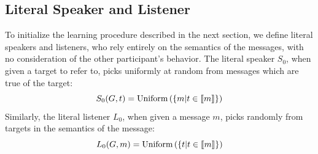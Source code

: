 \subsection{Literal Speaker and Listener}
To initialize the learning procedure described in the next section, we
define literal speakers and listeners, who rely entirely on the
semantics of the messages, with no consideration of the other
participant's behavior. The literal speaker $S_{0}$, when given a
target to refer to, picks uniformly at random from messages which are
true of the target:
%
\begin{equation}
S_{0}(G,t)  = \text{Uniform}\left(\{m \vert t \in \llbracket m\rrbracket\}\right)
\end{equation}
%
Similarly, the literal listener $L_0$, when given a message $m$, picks
randomly from targets in the semantics of the message:
%
\begin{equation}
L_{0}(G,m) = \text{Uniform}\left(\{t \vert t \in \llbracket m\rrbracket\}\right)
\end{equation}

